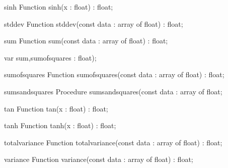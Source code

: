 \FPCexample{}


\begin{function}{sinh}
\Declaration
Function sinh(x : float) : float;
\Description

\Errors
\SeeAlso
\end{function}

\FPCexample{}


\begin{function}{stddev}
\Declaration
Function stddev(const data : array of float) : float;
\Description

\Errors
\SeeAlso
\end{function}

\FPCexample{}


\begin{function}{sum}
\Declaration
Function sum(const data : array of float) : float;
\Description

\Errors
\SeeAlso
\end{function}

\FPCexample{}


  var sum,sumofsquares : float);
\begin{function}{sumofsquares}
\Declaration
Function sumofsquares(const data : array of float) : float;
\Description

\Errors
\SeeAlso
\end{function}

\FPCexample{}


\begin{procedure}{sumsandsquares}
\Declaration
Procedure sumsandsquares(const data : array of float;
\Description

\Errors
\SeeAlso
\end{procedure}

\FPCexample{}


\begin{function}{tan}
\Declaration
Function tan(x : float) : float;
\Description

\Errors
\SeeAlso
\end{function}

\FPCexample{}


\begin{function}{tanh}
\Declaration
Function tanh(x : float) : float;
\Description

\Errors
\SeeAlso
\end{function}

\FPCexample{}


\begin{function}{totalvariance}
\Declaration
Function totalvariance(const data : array of float) : float;
\Description

\Errors
\SeeAlso
\end{function}

\FPCexample{}


\begin{function}{variance}
\Declaration
Function variance(const data : array of float) : float;
\Description

\Errors
\SeeAlso
\end{function}

\FPCexample{}